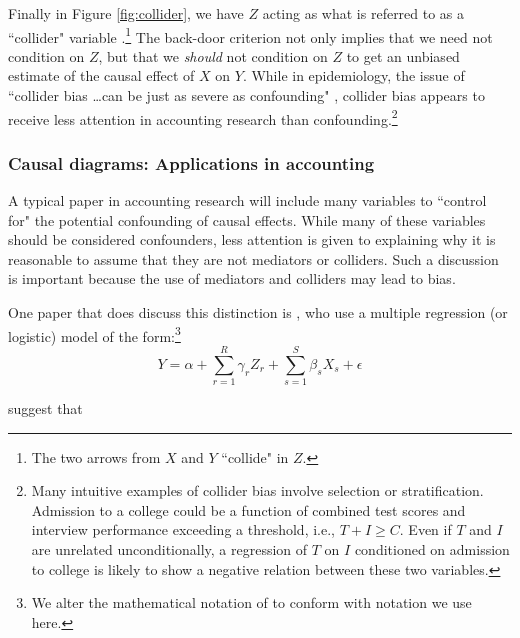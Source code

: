 \documentclass[12pt,reqno,titlepage]{amsart}
\begin{document}
\begin{doublespace}
Finally in Figure \ref{fig:collider}, we have $Z$ acting as what is referred to as a ``collider" variable \citep{Glymour:2008aa,Pearl:2009kh}.\footnote{
The two arrows from $X$ and $Y$ ``collide" in $Z$.} 
The back-door criterion not only implies that we need not condition on $Z$, but that we \emph{should} not condition on $Z$ to get an unbiased estimate of the causal effect of $X$ on $Y$.
While in epidemiology, the issue of ``collider bias \dots can be just as severe as confounding" \citep[p.\,186]{Glymour:2008aa}, collider bias appears to receive less attention in accounting research than confounding.\footnote{
Many intuitive examples of collider bias involve selection or stratification.
Admission to a college could be a function of combined test scores and interview performance exceeding a threshold, i.e., $T + I \geq C$. Even if $T$ and $I$ are unrelated unconditionally, a regression of $T$ on $I$ conditioned on admission to college is likely to show a negative relation between these two variables.}

\subsubsection{Causal diagrams: Applications in accounting}
A typical paper in accounting research will include many variables  to ``control for" the potential confounding of causal effects.
While many of these variables should be considered confounders, less attention is given to explaining why it is reasonable to assume that they are not mediators or colliders.
Such a discussion is important because the use of mediators and colliders may lead to bias.

One paper that does discuss this distinction is \citet{Larcker:2007aa}, who use a multiple regression (or logistic) model of the form:\footnote{We alter the mathematical notation of  \citet{Larcker:2007aa} to conform with notation we use here.}
\begin{equation}
Y = \alpha + \sum_{r=1}^R \gamma _r Z_r + \sum_{s=1}^S \beta_s X_s + \epsilon \label{eqn:lrt1}
\end{equation}

\noindent \citet{Larcker:2007aa} suggest that 


\end{doublespace}
\end{document}
